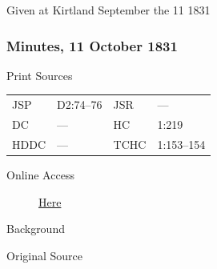 {				Given at Kirtland September the 11 1831
				
		\subsubsection{Minutes, 11 October 1831}
			\label{EMS-1831-JS-11-OCT-1831}
		
			\begin{description}
				\item[Print Sources]
			\end{description}

				\begin{tabular}{p{0.5in}p{1in}p{0.5in}p{1in}}
				JSP	 	& D2:74--76		& JSR 		& --- \\
				DC	 	& ---		 	& HC 		& 1:219 \\
				HDDC 	& ---			& TCHC 		& 1:153--154 \\
				\end{tabular}
			
			\begin{description}
				\item[Online Access] \href{https://www.josephsmithpapers.org/paper-summary/minutes-11-october-1831/1}{Here}
			\end{description}
			
			\begin{description}
				\item[Background]
			\end{description}
			
			
			\begin{description}
				\item[Original Source]
			\end{description}
			
			
}

